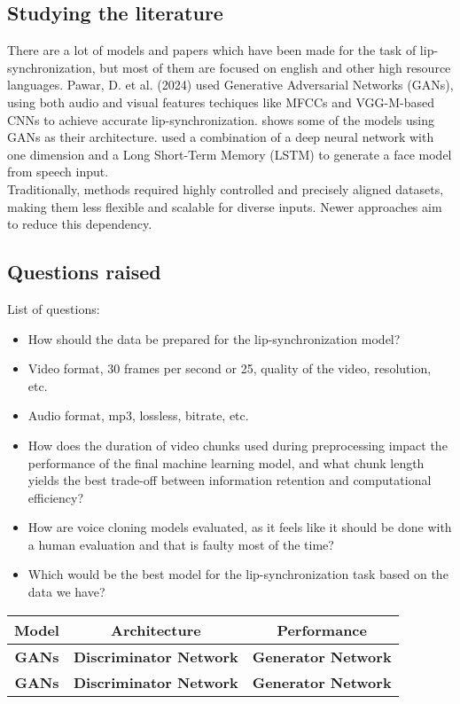 \documentclass[12pt]{article}
\begin{document}
\subsection{Studying the literature}
There are a lot of models and papers which have been made for the task of lip-synchronization, but most of them are focused on english and other high resource languages. Pawar, D. et al. (2024) used Generative Adversarial Networks (GANs), using both audio and visual features techiques like MFCCs and VGG-M-based CNNs to achieve accurate lip-synchronization. \cite{PAWAR2024100084} shows some of the models using GANs as their architecture. \cite{Li_2021} used a combination of a deep neural network with one dimension and a Long Short-Term Memory (LSTM) to generate a face model from speech input.\\
Traditionally, methods required highly controlled and precisely aligned datasets, making them less flexible and scalable for diverse inputs. Newer approaches aim to reduce this dependency. 
\subsection{Questions raised}
List of questions:
\begin{itemize}
    \item How should the data be prepared for the lip-synchronization model?
    \item Video format, 30 frames per second or 25, quality of the video, resolution, etc.
    \item Audio format, mp3, lossless, bitrate, etc.
    \item How does the duration of video chunks used during preprocessing impact the performance of the final machine learning model, and what chunk length yields the best trade-off between information retention and computational efficiency?
    \item How are voice cloning models evaluated, as it feels like it should be done with a human evaluation and that is faulty most of the time?
    \item Which would be the best model for the lip-synchronization task based on the data we have?
\end{itemize}
\begin{table}[h]
    \centering
    \begin{tabular}{|c|c|c|}
        \hline
        \textbf{Model} & \textbf{Architecture} & \textbf{Performance} \\
        \hline
        \textbf{GANs} & \textbf{Discriminator Network} & \textbf{Generator Network} \\
        \hline
        \textbf{GANs} & \textbf{Discriminator Network} & \textbf{Generator Network} \\
        \hline
    \end{tabular}
\end{table}



\end{document}
